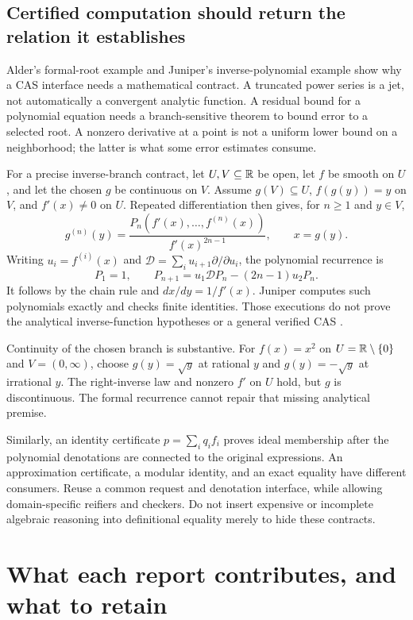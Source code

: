 \documentclass[11pt,letterpaper]{article}
\theoremstyle{definition}\newtheorem{definition}[proposition]{Definition}
\theoremstyle{remark}\newtheorem{remark}[proposition]{Remark}
\begin{document}
\subsection{Certified computation should return the relation it establishes}

Alder's formal-root example and Juniper's inverse-polynomial example show
why a CAS interface needs a mathematical contract. A truncated power series
is a jet, not automatically a convergent analytic function. A residual bound
for a polynomial equation needs a branch-sensitive theorem to bound error
to a selected root. A nonzero derivative at a point is not a uniform lower
bound on a neighborhood; the latter is what some error estimates consume.

For a precise inverse-branch contract, let $U,V\subseteq\mathbb R$ be open, let $f$
be smooth on $U$, and let the chosen $g$ be continuous on $V$. Assume
$g(V)\subseteq U$, $f(g(y))=y$ on $V$, and $f'(x)\ne0$ on $U$.
Repeated differentiation then gives, for $n\ge1$ and $y\in V$,
\[
 g^{(n)}(y)=\frac{P_n(f'(x),\ldots,f^{(n)}(x))}{f'(x)^{2n-1}},
 \qquad x=g(y).
\]
Writing $u_i=f^{(i)}(x)$ and
$\mathcal D=\sum_i u_{i+1}\partial/\partial u_i$, the polynomial recurrence is
\[
 P_1=1,\qquad P_{n+1}=u_1\mathcal D P_n-(2n-1)u_2P_n.
\]
It follows by the chain rule and $dx/dy=1/f'(x)$. Juniper computes such
polynomials exactly and checks finite identities. Those executions do not
prove the analytical inverse-function hypotheses or a general verified CAS
\cite{juniper,alder}.

Continuity of the chosen branch is substantive. For $f(x)=x^2$ on
$U=\mathbb R\setminus\{0\}$ and $V=(0,\infty)$, choose $g(y)=\sqrt y$ at rational
$y$ and $g(y)=-\sqrt y$ at irrational $y$. The right-inverse law and nonzero
$f'$ on $U$ hold, but $g$ is discontinuous. The formal recurrence cannot
repair that missing analytical premise.

Similarly, an identity certificate $p=\sum_i q_i f_i$ proves ideal membership
after the polynomial denotations are connected to the original expressions.
An approximation certificate, a modular identity, and an exact equality have
different consumers. Reuse a common request and denotation interface, while
allowing domain-specific reifiers and checkers. Do not insert expensive or
incomplete algebraic reasoning into definitional equality merely to hide
these contracts.

\section{What each report contributes, and what to retain}
\label{sec:profiles}
\end{document}
